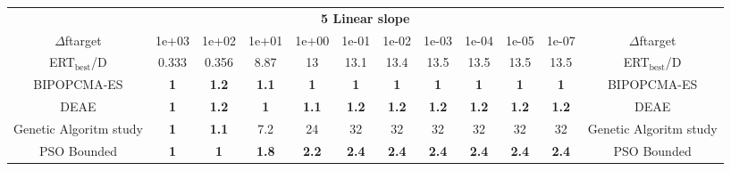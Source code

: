 \begin{tabular}{cccccccccccc}
 & \multicolumn{10}{c}{{\normalsize \textbf{5 Linear slope}}}\\
$\Delta$ftarget& 1e+03& 1e+02& 1e+01& 1e+00& 1e-01& 1e-02& 1e-03& 1e-04& 1e-05& 1e-07 & $\Delta$ftarget \\
ERT$_{\textrm{best}}$/D& 0.333& 0.356& 8.87& 13& 13.1& 13.4& 13.5& 13.5& 13.5& 13.5 & ERT$_{\textrm{best}}$/D \\
\hline
BIPOPCMA-ES & \textbf{1} & \textbf{1.2} & \textbf{1.1} & \textbf{1} & \textbf{1} & \textbf{1} & \textbf{1} & \textbf{1} & \textbf{1} & \textbf{1} & BIPOPCMA-ES \cite{add_an_entry_for_BIPOPCMA-ES_in_bbob.bib}\\
DEAE & \textbf{1} & \textbf{1.2} & \textbf{1} & \textbf{1.1} & \textbf{1.2} & \textbf{1.2} & \textbf{1.2} & \textbf{1.2} & \textbf{1.2} & \textbf{1.2} & DEAE \cite{add_an_entry_for_DEAE_in_bbob.bib}\\
Genetic Algoritm study & \textbf{1} & \textbf{1.1} & 7.2 & 24 & 32 & 32 & 32 & 32 & 32 & 32 & Genetic Algoritm study \cite{add_an_entry_for_Genetic Algoritm study_in_bbob.bib}\\
PSO Bounded & \textbf{1} & \textbf{1} & \textbf{1.8} & \textbf{2.2} & \textbf{2.4} & \textbf{2.4} & \textbf{2.4} & \textbf{2.4} & \textbf{2.4} & \textbf{2.4} & PSO Bounded \cite{add_an_entry_for_PSO Bounded_in_bbob.bib}
\end{tabular}

